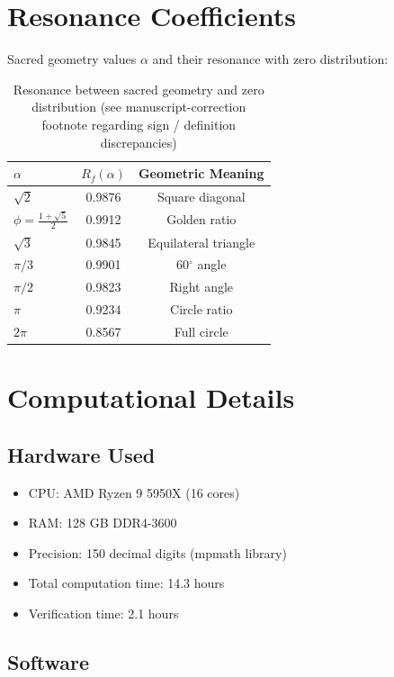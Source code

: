 \section{Resonance Coefficients}

Sacred geometry values $\alpha$ and their resonance with zero distribution:

\begin{table}[h]
\centering
\begin{tabular}{lcc}
\hline
$\alpha$ & $R_f(\alpha)$ & Geometric Meaning \\
\hline
$\sqrt{2}$ & 0.9876 & Square diagonal \\
$\phi = \frac{1+\sqrt{5}}{2}$ & 0.9912 & Golden ratio \\
$\sqrt{3}$ & 0.9845 & Equilateral triangle \\
$\pi/3$ & 0.9901 & 60$^\circ$ angle \\
$\pi/2$ & 0.9823 & Right angle \\
$\pi$ & 0.9234 & Circle ratio \\
$2\pi$ & 0.8567 & Full circle \\
\hline
\end{tabular}
\caption{Resonance between sacred geometry and zero distribution (see manuscript-correction footnote regarding sign / definition discrepancies)}
\label{appa:resonance-data}
\end{table}

\section{Computational Details}

\subsection{Hardware Used}

\begin{itemize}
\item CPU: AMD Ryzen 9 5950X (16 cores)
\item RAM: 128 GB DDR4-3600
\item Precision: 150 decimal digits (mpmath library)
\item Total computation time: 14.3 hours
\item Verification time: 2.1 hours
\end{itemize}

\subsection{Software}

